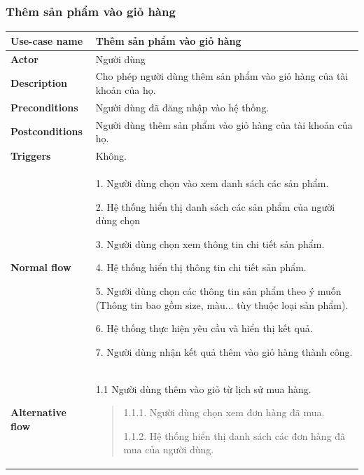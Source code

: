     \subsubsection{ Thêm sản phẩm vào giỏ hàng}    
    {
        \setlength\extrarowheight{6pt}
            \begin{longtable}{| p{} | p{} |} 
    \hline
    \textbf{Use-case name} 
    & 
    Thêm sản phẩm vào giỏ hàng
    \\
    \hline
    \textbf{Actor} 
    & 
    Người dùng
    \\
    \hline
    \textbf{Description} 
    & 
    Cho phép người dùng thêm sản phẩm vào giỏ hàng của tài khoản của họ.
    \\
    \hline
    \textbf{Preconditions} 
    &
    Người dùng đã đăng nhập vào hệ thống.
    \\
    \hline
    \textbf{Postconditions} 
    & 
    Người dùng thêm sản phẩm vào giỏ hàng của tài khoản của họ.
    \\
    \hline
    \textbf{Triggers} 
    &
    Không.
    \\
    \hline
    \begin{flushleft}
    \textbf{Normal flow}
    \end{flushleft}
    & 
        1. Người dùng chọn vào xem danh sách các sản phẩm.
        
        2. Hệ thống hiển thị danh sách các sản phẩm của người dùng chọn
        
        3. Người dùng chọn xem thông tin chi tiết sản phẩm.
        
        4. Hệ thống hiển thị thông tin chi tiết sản phẩm.
        
        5. Người dùng chọn các thông tin sản phẩm theo ý muốn (Thông tin bao gồm size, màu... tùy thuộc loại sản phẩm).
        
        6. Hệ thống thực hiện yêu cầu và hiển thị kết quả.
        
        7. Người dùng nhận kết quả thêm vào giỏ hàng thành công.
    \\
    \hline
    \begin{flushleft}
    \textbf{Alternative flow}
    \end{flushleft}
    & 
        1.1 Người dùng thêm vào giỏ từ lịch sử mua hàng.
        \begin{quote}
            1.1.1. Người dùng chọn xem đơn hàng đã mua.

            1.1.2. Hệ thống hiển thị danh sách các đơn hàng đã mua của người dùng.
        

\end{quote}
\end{longtable}}
